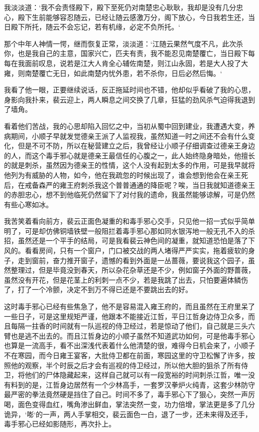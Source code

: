 我淡淡道：‘我不会责怪殿下，殿下至死仍对南楚忠心耿耿，我却是没有几分忠心，殿下生前能够容忍随云，已经让随云感激万分，阁下放心，今日我若生还，当日殿下所托，随云不会忘记，若有机缘，必定不负所托。‘

那个中年人神情一愕，继而恢复正常，淡淡道：‘江随云果然气度不凡，此次杀你，也是我自己的主意，国家兴亡，匹夫有责，我不能忍见南楚覆亡，当日殿下每每在我面前叹息，说若是江大人肯全心辅佐南楚，则江山永固，若是大人投了大雍，则南楚覆亡无日，如此南楚内忧外患，若不杀你，日后必然后悔。‘

我看了他一眼，正要继续说话，反正拖延时间也不错，他却似乎看破了我的心思，身影向我扑来，裴云迎上，两人瞬息之间交换了几章，狂猛的劲风杀气迫得我退到了墙角。

看着他们苦战，我的心思却陷入回忆之中，当初从蜀中回到建业，我遭遇大变，养病期间，小顺子早就发觉德亲王派了人监视我，虽然知道一时之间还不会有什么变化，但是不可不防，所以在秘营建立之后，我曾经让小顺子仔细调查过德亲王身边的人，而这个毒手邪心就是德亲王最信任的心腹之一，此人始终隐身暗处，他擅长的就是刺杀，虽然因为德亲王的性情，这个人没有起到太多的作用，可是我早就将他列为有威胁的人物，如今，他在我疏忽的时候出现了，谁会想到他会在亲王死后，在戒备森严的雍王府刺杀我这个普普通通的降臣呢？唉，当日我就知道德亲王的赤胆忠心，想不到他临死仍然留下了对付我的遗命，我虽然能够谅解，可是仍然有些心寒如冰。

我苦笑着看向前方，裴云正面色凝重的和毒手邪心交手，只见他一招一式似乎简单明了，可是却仿佛铜墙铁壁一般阻拦着毒手邪心那如同水银泻地一般无孔不入的杀招，虽然还是一个平手的结局，可是我看裴云神色间的凝重，就知道恐怕是落了下风的。看看房间，只有一个窗户，门口被交战的两人堵得严严实实，拖着疲软的身子，走到窗前，奋力推开窗子，遗憾的看到外面是一丛蔷薇，要说我这个园子，虽然整理过，但是毕竟没到春天，所以杂花杂草还是不少，例如窗子外面的野蔷薇，虽然没有开花，但是花茎上的利刺一点不少，若是我跳了出去，只怕要遍体鳞伤了，打了一个冷颤，决定不到万不得已还是不要跳出去的好。

这时毒手邪心已经有些焦急了，他不是容易混入雍王府的，而且虽然在王府里呆了一些日子，可是这里规矩严谨，他跟本不能接近江哲，平日江哲身边侍卫众多，而且每隔一拄香的时间就有一队巡视的侍卫经过，若是惊动了他们，自己就是三头六臂也是逃不出去的。而且江哲身边的小顺子虽然不知道武功如何，可是他毒手邪心也算是一流高手，看不出深浅代表着什么他清楚的很，难得今日机会来了，小顺子不在寒园，而今日雍王宴客，大批侍卫都在前面，寒园这里的守卫松懈了许多，按照他的观察，半个时辰之后才会有巡视的侍卫经过，所以他大胆的狙杀了所有侍卫，将他们的尸体隐藏起来，这样自己就可以有一段宽裕的时间刺杀江哲，唯一没有料到的是，江哲身边居然有一个少林高手，一套罗汉拳炉火纯青，这套少林防守最严密的拳法竟然硬是挡住了自己。时间不多了，毒手邪心下了狠心，突然一声厉喝，面色变得血红，嘴角渗出鲜血，掌法突然一变，功力倍增，掌法更是多了几分诡异，‘嘭‘的一声，两人手掌相交，裴云面色一白，退了一步，还未来得及还手，毒手邪心已经如影随形，再次扑上。

